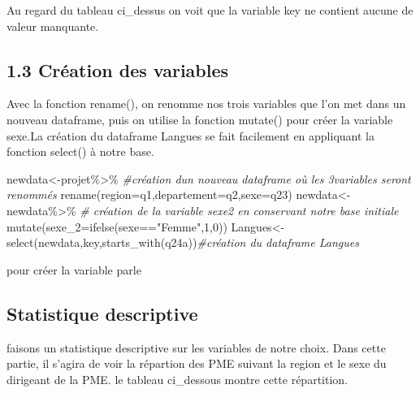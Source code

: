 \documentclass[
]{article}
\newenvironment{Shaded}{\begin{snugshade}}{\end{snugshade}}
\newcommand{\AttributeTok}[1]{\textcolor[rgb]{0.77,0.63,0.00}{#1}}
\newcommand{\CommentTok}[1]{\textcolor[rgb]{0.56,0.35,0.01}{\textit{#1}}}
\newcommand{\DecValTok}[1]{\textcolor[rgb]{0.00,0.00,0.81}{#1}}
\newcommand{\FunctionTok}[1]{\textcolor[rgb]{0.00,0.00,0.00}{#1}}
\newcommand{\NormalTok}[1]{#1}
\newcommand{\OtherTok}[1]{\textcolor[rgb]{0.56,0.35,0.01}{#1}}
\newcommand{\SpecialCharTok}[1]{\textcolor[rgb]{0.00,0.00,0.00}{#1}}
\newcommand{\StringTok}[1]{\textcolor[rgb]{0.31,0.60,0.02}{#1}}
\begin{document}
Au regard du tableau ci\_dessus on voit que la variable key ne contient
aucune de valeur manquante.

\hypertarget{cruxe9ation-des-variables}{%
\subsection{1.3 Création des
variables}\label{cruxe9ation-des-variables}}

Avec la fonction rename(), on renomme nos trois variables que l'on met
dans un nouveau dataframe, puis on utilise la fonction mutate() pour
créer la variable sexe.La création du dataframe Langues se fait
facilement en appliquant la fonction select() à notre base.

\begin{Shaded}
\begin{Highlighting}[]
\NormalTok{newdata}\OtherTok{\textless{}{-}}\NormalTok{projet}\SpecialCharTok{\%\textgreater{}\%} \CommentTok{\#création d\textquotesingle{}un nouveau dataframe où les 3variables seront renommés}
  \FunctionTok{rename}\NormalTok{(}\AttributeTok{region=}\NormalTok{q1,}\AttributeTok{departement=}\NormalTok{q2,}\AttributeTok{sexe=}\NormalTok{q23)}
\NormalTok{newdata}\OtherTok{\textless{}{-}}\NormalTok{newdata}\SpecialCharTok{\%\textgreater{}\%} \CommentTok{\# création de la variable sexe2 en conservant notre base initiale}
  \FunctionTok{mutate}\NormalTok{(}\AttributeTok{sexe\_2=}\FunctionTok{ifelse}\NormalTok{(sexe}\SpecialCharTok{==}\StringTok{"Femme"}\NormalTok{,}\DecValTok{1}\NormalTok{,}\DecValTok{0}\NormalTok{))}
\NormalTok{Langues}\OtherTok{\textless{}{-}}\FunctionTok{select}\NormalTok{(newdata,}\StringTok{\textquotesingle{}key\textquotesingle{}}\NormalTok{,}\FunctionTok{starts\_with}\NormalTok{(}\StringTok{\textquotesingle{}q24a\textquotesingle{}}\NormalTok{))}\CommentTok{\#création du dataframe Langues}
\end{Highlighting}
\end{Shaded}

pour créer la variable parle

\hypertarget{statistique-descriptive}{%
\subsection{Statistique descriptive}\label{statistique-descriptive}}

faisons un statistique descriptive sur les variables de notre choix.
Dans cette partie, il s'agira de voir la répartion des PME suivant la
region et le sexe du dirigeant de la PME. le tableau ci\_dessous montre
cette répartition.
\end{document}
